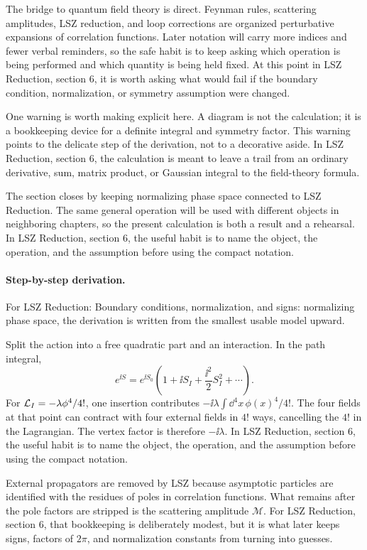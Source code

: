 The bridge to quantum field theory is direct.  Feynman rules, scattering amplitudes, LSZ reduction, and loop corrections are organized perturbative expansions of correlation functions.  Later notation will carry more indices and fewer verbal reminders, so the safe habit is to keep asking which operation is being performed and which quantity is being held fixed.  At this point in LSZ Reduction, section 6, it is worth asking what would fail if the boundary condition, normalization, or symmetry assumption were changed.

One warning is worth making explicit here.  A diagram is not the calculation; it is a bookkeeping device for a definite integral and symmetry factor.  This warning points to the delicate step of the derivation, not to a decorative aside.  In LSZ Reduction, section 6, the calculation is meant to leave a trail from an ordinary derivative, sum, matrix product, or Gaussian integral to the field-theory formula.

The section closes by keeping normalizing phase space connected to LSZ Reduction.  The same general operation will be used with different objects in neighboring chapters, so the present calculation is both a result and a rehearsal.  In LSZ Reduction, section 6, the useful habit is to name the object, the operation, and the assumption before using the compact notation.



\paragraph{Step-by-step derivation.}

For LSZ Reduction: Boundary conditions, normalization, and signs: normalizing phase space, the derivation is written from the smallest usable model upward.

Split the action into a free quadratic part and an interaction.  In the path integral,
\[
  e^{\ii S}=e^{\ii S_0}\left(1+\ii S_I+\frac{\ii^2}{2}S_I^2+\cdots\right).
\]
For \(\mathcal L_I=-\lambda\phi^4/4!\), one insertion contributes \(-\ii\lambda\int\dd^4x\,\phi(x)^4/4!\).  The four fields at that point can contract with four external fields in \(4!\) ways, cancelling the \(4!\) in the Lagrangian.  The vertex factor is therefore \(-\ii\lambda\).  In LSZ Reduction, section 6, the useful habit is to name the object, the operation, and the assumption before using the compact notation.

External propagators are removed by LSZ because asymptotic particles are identified with the residues of poles in correlation functions.  What remains after the pole factors are stripped is the scattering amplitude \(\mathcal M\).  For LSZ Reduction, section 6, that bookkeeping is deliberately modest, but it is what later keeps signs, factors of \(2\pi\), and normalization constants from turning into guesses.

